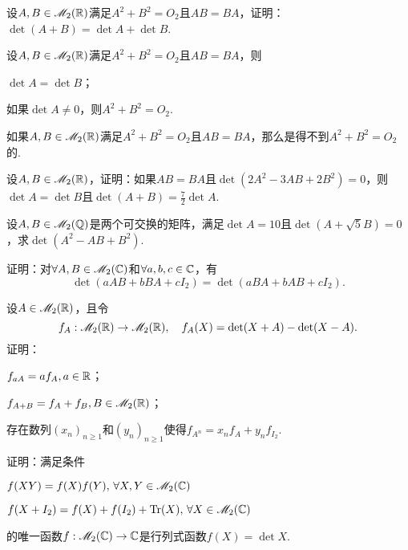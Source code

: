 \begin{problem}
  设$A,B\in\mathscr M_2(\mathbb R)$满足$A^2+B^2=O_2$且$AB=BA$，证明：$\det(A+B)=\det A+\det B$.
\end{problem}

\begin{problem}
  设$A,B\in\mathscr M_2(\mathbb R)$满足$A^2+B^2=O_2$且$AB=BA$，则
  \begin{enum}
    \item $\det A= \det B$；
    \item 如果$\det A\ne0$，则$A^2+B^2=O_2$.
  \end{enum}

  \begin{nota}
    如果$A,B\in\mathscr M_2(\mathbb R)$满足$A^2+B^2=O_2$且$AB=BA$，那么是得不到$A^2+B^2=O_2$的.
  \end{nota}
\end{problem}

\begin{problem}
  设$A,B\in\mathscr M_2(\mathbb R)$，证明：如果$AB=BA$且$\det(2A^2-3AB+2B^2)=0$，则$\det A=\det B$且$\det(A+B)=\frac72\det A$.
\end{problem}

\begin{problem}
  设$A,B\in\mathscr M_2(\mathbb Q)$是两个可交换的矩阵，满足$\det A=10$且$\det(A+\sqrt5B)=0$，求$\det(A^2-AB+B^2)$.
\end{problem}

\begin{problem}
  证明：对$\forall A,B\in\mathscr M_2(\mathbb C)$和$\forall a,b,c\in\mathbb C$，有
  \[
    \det(aAB + bBA + cI_2) = \det (aBA + bAB + cI_2).
  \]
\end{problem}

\begin{problem}
  设$A\in\mathscr M_2(\mathbb R)$，且令
  \[
    f_A:\mathscr M_2(\mathbb R) \to \mathscr M_2(\mathbb R),\quad f_A(X) = \det(X + A) - \det(X - A).
  \]
  证明：
  \begin{enum}
    \item\label{prob2.35a} $f_{aA}=af_A,a\in\mathbb R$；
    \item\label{prob2.35b} $f_{A+B}=f_A+f_B,B\in\mathscr M_2(\mathbb R)$；
    \item 存在数列$(x_n)_{n\ge1}$和$(y_n)_{n\ge1}$使得$f_{A^n}=x_nf_A+y_nf_{I_2}$.
  \end{enum}
\end{problem}

\begin{problem}
  证明：满足条件
  \begin{enum}
    \item $f(XY)=f(X)f(Y),\,\forall X,Y\in\mathscr M_2(\mathbb C)$
    \item $f(X+I_2)=f(X)+f(I_2)+\operatorname{Tr}(X),\,\forall X\in\mathscr M_2(\mathbb C)$
  \end{enum}
  的唯一函数$f:\mathscr M_2(\mathbb C)\to\mathbb C$是行列式函数$f(X)=\det X$.
\end{problem}


